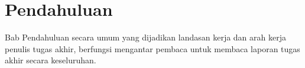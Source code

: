 \chapter{Pendahuluan}

Bab Pendahuluan secara umum yang dijadikan landasan kerja dan arah kerja penulis tugas akhir, berfungsi mengantar pembaca untuk membaca laporan tugas akhir secara keseluruhan.







